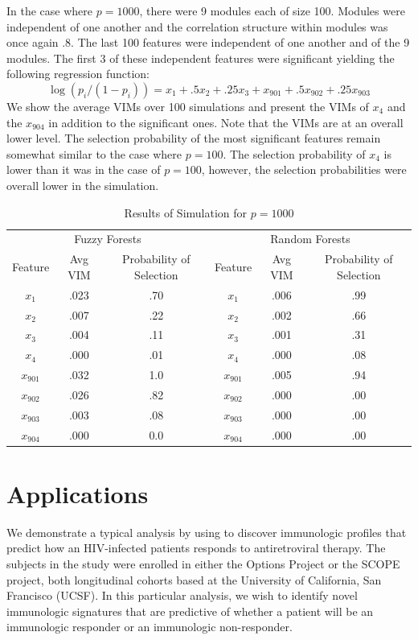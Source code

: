 \documentclass[article,shortnames]{jss}
\begin{document}
In the case where $p=1000$, there were 9 modules each of size 100.  Modules were independent of one
another and the correlation structure within modules was  once again .8.  The last 100 features were independent
of one another and of the 9 modules.  The first 3 of these independent features were significant yielding the following
regression function:
\begin{equation}
\log(p_{i}/(1-p_{i})) = x_{1} + .5x_{2} + .25x_{3} + x_{901} + .5x_{902} + .25x_{903}
\end{equation}
We show the average VIMs over 100 simulations and present the VIMs of $x_{4}$ and the $x_{904}$ in
addition to the significant ones. Note that the VIMs are at an overall lower level.  The selection probability 
of the most significant features remain somewhat similar to the case where $p=100$.  The selection 
probability of $x_{4}$ is lower than it was in the case of $p=100$, however, the selection probabilities
were overall lower in the simulation.
\begin{table}
\centering
\caption{Results of Simulation for $p=1000$}
\begin{tabular}[bc]{c c c | c c c}
\hline
\multicolumn{3}{c|}{Fuzzy Forests} & \multicolumn{3}{c}{Random Forests}\\
Feature & Avg VIM & Probability of Selection & Feature & Avg VIM & Probability of Selection\\
\hline
$x_{1}$  & .023 & .70 & $x_{1}$ & .006 & .99\\  
$x_{2}$  & .007 & .22 & $x_{2}$ & .002 & .66\\
$x_{3}$ & .004 &  .11 & $x_{3}$ & .001 & .31\\
$x_{4}$  & .000 &  .01 & $x_{4}$ & .000 & .08\\
$x_{901}$ & .032 & 1.0 & $x_{901}$ & .005 & .94\\
$x_{902}$ & .026 & .82 & $x_{902}$ & .000 & .00\\
$x_{903}$ & .003 & .08 & $x_{903}$ & .000 & .00\\
$x_{904}$ & .000 & 0.0 & $x_{904}$ & .000 & .00
\end{tabular}
\end{table}

\section{Applications}
We demonstrate a typical analysis by using  to discover immunologic profiles 
that predict how an HIV-infected patients responds to antiretroviral therapy.  
The subjects in the study were enrolled in either the Options Project or the SCOPE project, both longitudinal cohorts based at the University of California, San Francisco (UCSF).
In this particular analysis, we wish to identify novel immunologic signatures that are predictive of whether a patient will be an immunologic
responder or an immunologic non-responder.  
\end{document}
